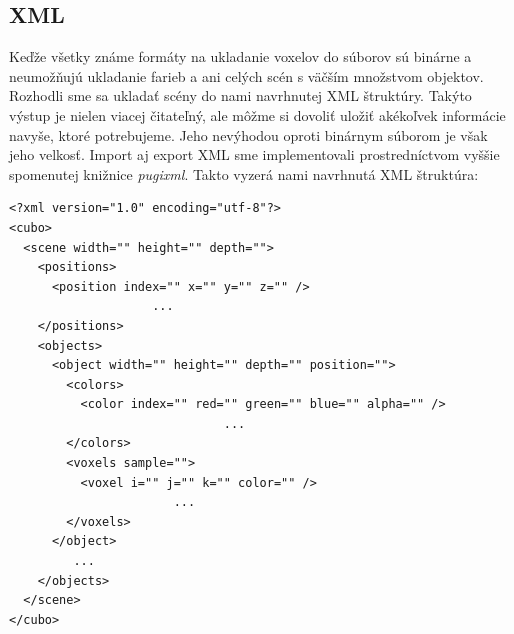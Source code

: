 \subsection{XML}
Keďže všetky známe formáty na ukladanie voxelov do súborov sú binárne a neumožňujú ukladanie farieb a ani celých scén s väčším množstvom objektov. Rozhodli sme sa ukladať scény do nami navrhnutej XML štruktúry. Takýto výstup je nielen viacej čitateľný, ale môžme si dovoliť uložiť akékoľvek informácie navyše, ktoré potrebujeme. Jeho nevýhodou oproti binárnym súborom je však jeho velkosť.
Import aj export XML sme implementovali prostredníctvom vyššie spomenutej knižnice \textit{pugixml}.
\eject
Takto vyzerá nami navrhnutá XML štruktúra:

\begin{framed}
\begin{lstlisting}
<?xml version="1.0" encoding="utf-8"?>
<cubo>
  <scene width="" height="" depth="">
    <positions>
      <position index="" x="" y="" z="" />
                    ...
    </positions>
    <objects>
      <object width="" height="" depth="" position="">
        <colors>
          <color index="" red="" green="" blue="" alpha="" />
                              ...
        </colors>
        <voxels sample="">
          <voxel i="" j="" k="" color="" />
                       ...
        </voxels>
      </object>
         ...
    </objects>
  </scene>
</cubo>
\end{lstlisting}

\end{framed}
